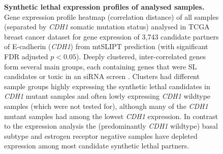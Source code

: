 \begin{figure}[!ht]
\begin{mdframed}
  \centering
    \caption[Synthetic lethal expression profiles of analysed samples]{\small \textbf{Synthetic lethal expression profiles of analysed samples.} Gene expression profile heatmap (correlation distance) of all samples (separated by \textit{CDH1} somatic mutation status) analysed in TCGA breast cancer dataset for gene expression of 3,743 candidate partners of E-cadherin (\textit{CDH1}) from mtSLIPT prediction (with significant FDR adjusted $p < 0.05$). Deeply clustered, inter-correlated genes form several main groups, each containing genes that were SL candidates or toxic in an siRNA screen \cite{Telford2015}. Clusters had different sample groups highly expressing the synthetic lethal candidates in \textit{CDH1} mutant samples and often lowly expressing \textit{CDH1} wildtype samples (which were not tested for), although many of the \textit{CDH1} mutant samples had among the lowest \textit{CDH1} expression. In contrast to the expression analysis the (predominantly \textit{CDH1} wildtype) basal subtype and estrogen receptor negative samples have depleted expression among most candidate synthetic lethal partners. 
}
\label{fig:slipt_expr_mtSL}
\end{mdframed}
\end{figure}

